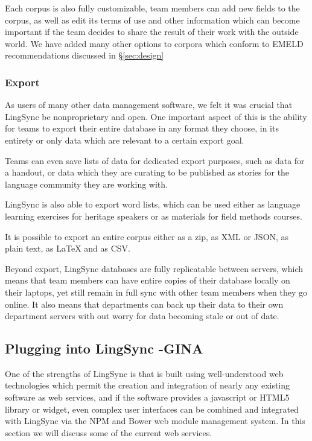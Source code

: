 \documentclass[letterpaper, 12pt, dvips]{mitwpl}
\begin{document}
Each corpus is also fully customizable, team members can add new fields to the corpus, as well as edit its terms of use and other information which can become important if the team decides to share the result of their work with the outside world. We have added many other options to corpora which conform to EMELD recommendations discussed in \S\ref{sec:design}

\subsubsection{Export}

As users of many other data management software, we felt it was crucial that LingSync be nonproprietary and open. One important aspect of this is the ability for teams to export their entire database in any format they choose, in its entirety or only data which are relevant to a certain export goal. 

Teams can even save lists of data for dedicated export purposes, such as data for a handout, or data which they are curating to be published as stories for the language community they are working with.

LingSync is also able to export word lists, which can be used either as language learning exercises for heritage speakers or as materials for field methods courses. 

It is possible to export an entire corpus either as a zip, as XML or JSON, as plain text, as LaTeX and  as CSV. 

Beyond export, LingSync databases are fully replicatable between servers, which means that team members can have entire copies of their database locally on their laptops, yet still remain in full sync with other team members when they go online. It also means that departments can back up their data to their own department servers with out worry for data becoming stale or out of date. 


\subsection{Plugging into LingSync -GINA}

One of the strengths of LingSync is that is built using well-understood web technologies which permit the creation and integration of nearly any existing software as web services, and if the software provides a javascript or HTML5 library or widget, even complex user interfaces can be combined and integrated with LingSync via the NPM and Bower web module management system. In this section we will discuss some of the current web services.
\end{document}
